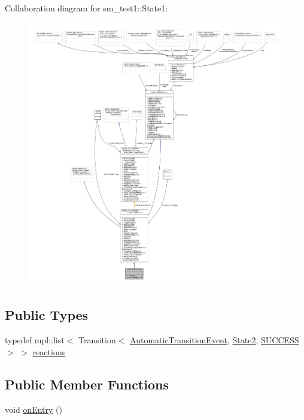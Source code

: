 Collaboration diagram for sm\+\_\+test1\+:\+:State1\+:
\nopagebreak
\begin{figure}[H]
\begin{center}
\leavevmode
\includegraphics[width=350pt]{structsm__test1_1_1State1__coll__graph}
\end{center}
\end{figure}
\subsection*{Public Types}
\begin{DoxyCompactItemize}
\item 
typedef mpl\+::list$<$ Transition$<$ \hyperlink{structsm__test1_1_1AutomaticTransitionEvent}{Automatic\+Transition\+Event}, \hyperlink{structsm__test1_1_1State2}{State2}, \hyperlink{classSUCCESS}{S\+U\+C\+C\+E\+SS} $>$ $>$ \hyperlink{structsm__test1_1_1State1_acbfcf212fdd6d8896d2f1d40e41c63b2}{reactions}
\end{DoxyCompactItemize}
\subsection*{Public Member Functions}
\begin{DoxyCompactItemize}
\item 
void \hyperlink{structsm__test1_1_1State1_ae5d21dd2726e2433a2251cd81c7ec20e}{on\+Entry} ()
\end{DoxyCompactItemize}
